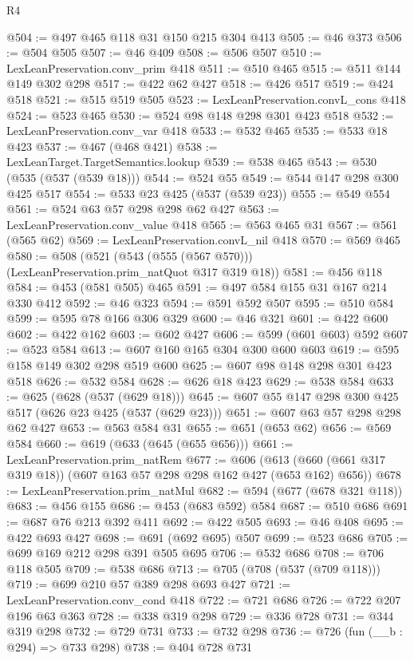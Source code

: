 \begin{lexlean}{R4}
\begin{coremodule}
@504 := @497 @465 @118 @31 @150 @215 @304 @413
@505 := @46 @373
@506 := @504 @505
@507 := @46 @409
@508 := @506 @507
@510 := LexLeanPreservation.conv_prim @418
@511 := @510 @465
@515 := @511 @144 @149 @302 @298
@517 := @422 @62 @427
@518 := @426 @517
@519 := @424 @518
@521 := @515 @519 @505
@523 := LexLeanPreservation.convL_cons @418
@524 := @523 @465
@530 := @524 @98 @148 @298 @301 @423 @518
@532 := LexLeanPreservation.conv_var @418
@533 := @532 @465
@535 := @533 @18 @423
@537 := @467 (@468 @421)
@538 := LexLeanTarget.TargetSemantics.lookup
@539 := @538 @465
@543 := @530 (@535 (@537 (@539 @18)))
@544 := @524 @55
@549 := @544 @147 @298 @300 @425 @517
@554 := @533 @23 @425 (@537 (@539 @23))
@555 := @549 @554
@561 := @524 @63 @57 @298 @298 @62 @427
@563 := LexLeanPreservation.conv_value @418
@565 := @563 @465 @31
@567 := @561 (@565 @62)
@569 := LexLeanPreservation.convL_nil @418
@570 := @569 @465
@580 := @508 (@521 (@543 (@555 (@567 @570))) (LexLeanPreservation.prim_natQuot @317 @319 @18))
@581 := @456 @118
@584 := @453 (@581 @505) @465
@591 := @497 @584 @155 @31 @167 @214 @330 @412
@592 := @46 @323
@594 := @591 @592 @507
@595 := @510 @584
@599 := @595 @78 @166 @306 @329
@600 := @46 @321
@601 := @422 @600
@602 := @422 @162
@603 := @602 @427
@606 := @599 (@601 @603) @592
@607 := @523 @584
@613 := @607 @160 @165 @304 @300 @600 @603
@619 := @595 @158 @149 @302 @298 @519 @600
@625 := @607 @98 @148 @298 @301 @423 @518
@626 := @532 @584
@628 := @626 @18 @423
@629 := @538 @584
@633 := @625 (@628 (@537 (@629 @18)))
@645 := @607 @55 @147 @298 @300 @425 @517 (@626 @23 @425 (@537 (@629 @23)))
@651 := @607 @63 @57 @298 @298 @62 @427
@653 := @563 @584 @31
@655 := @651 (@653 @62)
@656 := @569 @584
@660 := @619 (@633 (@645 (@655 @656)))
@661 := LexLeanPreservation.prim_natRem
@677 := @606 (@613 (@660 (@661 @317 @319 @18)) (@607 @163 @57 @298 @298 @162 @427 (@653 @162) @656))
@678 := LexLeanPreservation.prim_natMul
@682 := @594 (@677 (@678 @321 @118))
@683 := @456 @155
@686 := @453 (@683 @592) @584
@687 := @510 @686
@691 := @687 @76 @213 @392 @411
@692 := @422 @505
@693 := @46 @408
@695 := @422 @693 @427
@698 := @691 (@692 @695) @507
@699 := @523 @686
@705 := @699 @169 @212 @298 @391 @505 @695
@706 := @532 @686
@708 := @706 @118 @505
@709 := @538 @686
@713 := @705 (@708 (@537 (@709 @118)))
@719 := @699 @210 @57 @389 @298 @693 @427
@721 := LexLeanPreservation.conv_cond @418
@722 := @721 @686
@726 := @722 @207 @196 @63 @363
@728 := @338 @319 @298
@729 := @336 @728
@731 := @344 @319 @298
@732 := @729 @731
@733 := @732 @298
@736 := @726 (fun (__b : @294) => @733 @298)
@738 := @404 @728 @731

\end{coremodule}
\end{lexlean}
